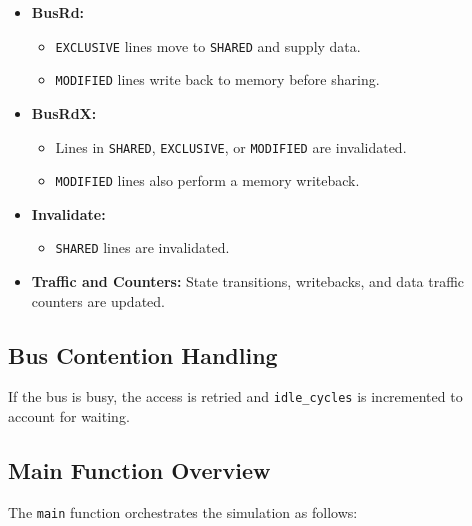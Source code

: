 \documentclass[a4paper,12pt]{article}
\begin{document}
\begin{itemize}
    \item \textbf{BusRd:}
    \begin{itemize}
        \item \texttt{EXCLUSIVE} lines move to \texttt{SHARED} and supply data.
        \item \texttt{MODIFIED} lines write back to memory before sharing.
    \end{itemize}
    \item \textbf{BusRdX:}
    \begin{itemize}
        \item Lines in \texttt{SHARED}, \texttt{EXCLUSIVE}, or \texttt{MODIFIED} are invalidated.
        \item \texttt{MODIFIED} lines also perform a memory writeback.
    \end{itemize}
    \item \textbf{Invalidate:}
    \begin{itemize}
        \item \texttt{SHARED} lines are invalidated.
    \end{itemize}
    \item \textbf{Traffic and Counters:} State transitions, writebacks, and data traffic counters are updated.
\end{itemize}

\subsection{Bus Contention Handling}

If the bus is busy, the access is retried and \texttt{idle\_cycles} is incremented to account for waiting.
\subsection{Main Function Overview}

The \texttt{main} function orchestrates the simulation as follows:
\end{document}
